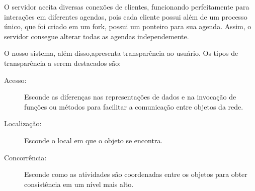 \documentclass[10pt,a4paper]{article}
\begin{document}
O servidor aceita diversas conexões de clientes, funcionando
perfeitamente para interações em diferentes agendas, pois cada
cliente possui além de um processo único, que foi criado em um fork,
possui um ponteiro para sua agenda. Assim, o servidor consegue
alterar todas as agendas independemente.

 O nosso sistema, além disso,apresenta
transparência ao usuário. Os tipos de transparência a serem destacados
são:

\begin{description}
\item [Acesso:] Esconde as diferenças nas representações de dados e na invocação de funções ou métodos para facilitar a comunicação entre objetos da rede.
\item [Localização:] Esconde o local em que o objeto se encontra.
\item [Concorrência:] Esconde como as atividades são coordenadas entre os objetos para obter consistência em um nível mais alto.
\end{description}
\end{document}
